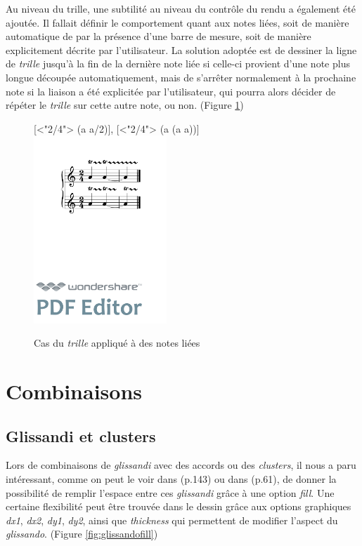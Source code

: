 \documentclass{article}
\newenvironment{gmncode}	{\vspace{-2mm}\small\verbatim}{\endverbatim\vspace{-2mm}}
\begin{document}

Au niveau du trille, une subtilité au niveau du contr\^ole du rendu a également été ajoutée. Il fallait définir le comportement quant aux notes liées, soit de manière automatique de par la présence d'une barre de mesure, soit de manière explicitement décrite par l'utilisateur. La solution adoptée est de dessiner la ligne de \emph{trille} jusqu'à la fin de la dernière note liée si celle-ci provient d'une note plus longue découpée automatiquement, mais de s'arrêter normalement à la prochaine note si la liaison a été explicitée par l'utilisateur, qui pourra alors décider de répéter le \emph{trille} sur cette autre note, ou non. (Figure \ref{fig:trill})

\begin{figure}[h]
\centering
\begin{gmncode}
{
  [\meter<"2/4"> \trill({a} {a/2})],
  [\meter<"2/4"> \trill({a} \tie({a} {a}))]
}
\end{gmncode}
\includegraphics[width=5cm]{img/trill.pdf}
\caption{Cas du \emph{trille} appliqué à des notes liées}
\label{fig:trill}
\end{figure}

\section{Combinaisons}\label{sec:combinaisons}

\subsection{Glissandi et clusters}\label{subsec:glissandiCluster}

Lors de combinaisons de \emph{glissandi}  avec des accords ou des \emph{clusters}, il nous a paru intéressant, comme on peut le voir dans \cite{gould2011behind} (p.143) ou dans \cite{stone1980music} (p.61), de donner la possibilité de remplir l'espace entre ces \emph{glissandi} grâce à une option \emph{fill}. Une certaine flexibilité peut être trouvée dans le dessin grâce aux options graphiques \emph{dx1}, \emph{dx2}, \emph{dy1}, \emph{dy2}, ainsi que \emph{thickness} qui permettent de modifier l'aspect du \emph{glissando}. (Figure \ref{fig:glissandofill})
\end{document}
